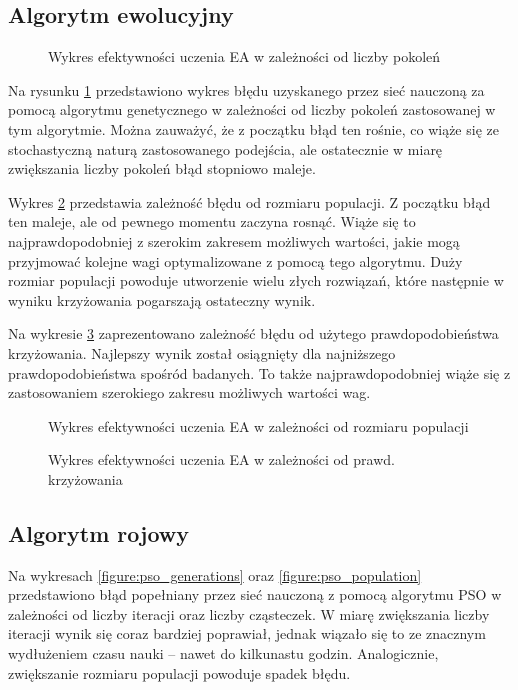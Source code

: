 \documentclass[11pt,a4paper,oneside]{report}
\begin{document}
\subsection{Algorytm ewolucyjny}

\begin{figure}[H]
	\caption{Wykres efektywności uczenia EA w zależności od liczby pokoleń \label{figure:ea_generations}}
	
\end{figure}

Na rysunku \ref{figure:ea_generations} przedstawiono wykres błędu uzyskanego przez sieć nauczoną za pomocą algorytmu genetycznego w zależności od liczby pokoleń zastosowanej w tym algorytmie. Można zauważyć, że z początku błąd ten rośnie, co wiąże się ze stochastyczną naturą zastosowanego podejścia, ale ostatecznie w miarę zwiększania liczby pokoleń błąd stopniowo maleje. 

Wykres \ref{figure:ea_population} przedstawia zależność błędu od rozmiaru populacji. Z początku błąd ten maleje, ale od pewnego momentu zaczyna rosnąć. Wiąże się to najprawdopodobniej z szerokim zakresem możliwych wartości, jakie mogą przyjmować kolejne wagi optymalizowane z pomocą tego algorytmu. Duży rozmiar populacji powoduje utworzenie wielu złych rozwiązań, które następnie w wyniku krzyżowania pogarszają ostateczny wynik.

Na wykresie \ref{figure:ea_cp} zaprezentowano zależność błędu od użytego prawdopodobieństwa krzyżowania. Najlepszy wynik został osiągnięty dla najniższego prawdopodobieństwa spośród badanych. To także najprawdopodobniej wiąże się z zastosowaniem szerokiego zakresu możliwych wartości wag.

\begin{figure}[H]
	\caption{Wykres efektywności uczenia EA w zależności od rozmiaru populacji \label{figure:ea_population}}
	
\end{figure}

\begin{figure}[H]
	\caption{Wykres efektywności uczenia EA w zależności od prawd. krzyżowania \label{figure:ea_cp}}
	
\end{figure}

\subsection{Algorytm rojowy}

Na wykresach \ref{figure:pso_generations} oraz \ref{figure:pso_population} przedstawiono błąd popełniany przez sieć nauczoną z pomocą algorytmu PSO w zależności od liczby iteracji oraz liczby cząsteczek. W miarę zwiększania liczby iteracji wynik się coraz bardziej poprawiał, jednak wiązało się to ze znacznym wydłużeniem czasu nauki -- nawet do kilkunastu godzin. Analogicznie, zwiększanie rozmiaru populacji powoduje spadek błędu.
\end{document}

